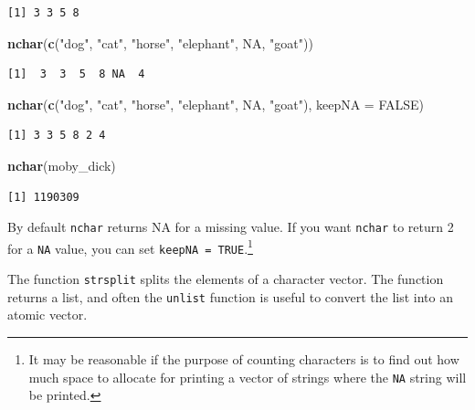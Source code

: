 \documentclass[
]{krantz}
\makeatletter
\newenvironment{Shaded}{\begin{snugshade}}{\end{snugshade}}
\newcommand{\DataTypeTok}[1]{\textcolor[rgb]{0.27,0.27,0.27}{#1}}
\newcommand{\KeywordTok}[1]{\textcolor[rgb]{0.27,0.27,0.27}{\textbf{#1}}}
\newcommand{\NormalTok}[1]{#1}
\newcommand{\OtherTok}[1]{\textcolor[rgb]{0.37,0.37,0.37}{#1}}
\newcommand{\StringTok}[1]{\textcolor[rgb]{0.5,0.5,0.5}{#1}}
\newenvironment{kframe}{%
\medskip{}
\setlength{\fboxsep}{.8em}
 \def\at@end@of@kframe{}%
 \ifinner\ifhmode%
  \def\at@end@of@kframe{\end{minipage}}%
  \begin{minipage}{\columnwidth}%
 \fi\fi%
 \def\FrameCommand##1{\hskip\@totalleftmargin \hskip-\fboxsep
 \colorbox{shadecolor}{##1}\hskip-\fboxsep
     \hskip-\linewidth \hskip-\@totalleftmargin \hskip\columnwidth}%
 \MakeFramed {\advance\hsize-\width
   \@totalleftmargin\z@ \linewidth\hsize
   \@setminipage}}%
 {\par\unskip\endMakeFramed%
 \at@end@of@kframe}
\renewenvironment{Shaded}{\begin{kframe}}{\end{kframe}}
\makeatother
\begin{document}
\begin{verbatim}
[1] 3 3 5 8
\end{verbatim}

\begin{Shaded}
\begin{Highlighting}[]
\KeywordTok{nchar}\NormalTok{(}\KeywordTok{c}\NormalTok{(}\StringTok{"dog"}\NormalTok{, }\StringTok{"cat"}\NormalTok{, }\StringTok{"horse"}\NormalTok{, }\StringTok{"elephant"}\NormalTok{, }\OtherTok{NA}\NormalTok{, }\StringTok{"goat"}\NormalTok{))}
\end{Highlighting}
\end{Shaded}

\begin{verbatim}
[1]  3  3  5  8 NA  4
\end{verbatim}

\begin{Shaded}
\begin{Highlighting}[]
\KeywordTok{nchar}\NormalTok{(}\KeywordTok{c}\NormalTok{(}\StringTok{"dog"}\NormalTok{, }\StringTok{"cat"}\NormalTok{, }\StringTok{"horse"}\NormalTok{, }\StringTok{"elephant"}\NormalTok{, }\OtherTok{NA}\NormalTok{, }\StringTok{"goat"}\NormalTok{), }\DataTypeTok{keepNA =} \OtherTok{FALSE}\NormalTok{)}
\end{Highlighting}
\end{Shaded}

\begin{verbatim}
[1] 3 3 5 8 2 4
\end{verbatim}

\begin{Shaded}
\begin{Highlighting}[]
\KeywordTok{nchar}\NormalTok{(moby\_dick)}
\end{Highlighting}
\end{Shaded}

\begin{verbatim}
[1] 1190309
\end{verbatim}

By default \texttt{nchar} returns NA for a missing value. If you want \texttt{nchar} to return 2 for a \texttt{NA} value, you can set \texttt{keepNA\ =\ TRUE}.\footnote{It may be reasonable if the purpose of counting characters is to find out how much space to allocate for printing a vector of strings where the \texttt{NA} string will be printed.}

The function \texttt{strsplit} splits the elements of a character vector. The function returns a list, and often the \texttt{unlist} function is useful to convert the list into an atomic vector.
\end{document}

